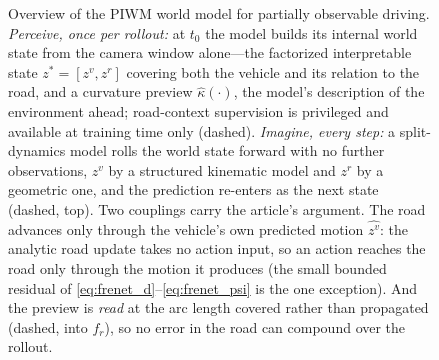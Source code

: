 \documentclass[preprint,12pt]{elsarticle}
\newcommand{\zv}{z^{v}}      %
\newcommand{\zr}{z^{r}}      %
\newcommand{\zstar}{z^{*}}   %
\begin{document}
\begin{figure}[t]
    \caption{Overview of the PIWM world model for partially observable driving.
    \emph{Perceive, once per rollout:} at $t_0$ the model builds its internal
    world state from the camera window alone---the factorized interpretable
    state $\zstar = [\zv, \zr]$ covering both the vehicle and its relation to
    the road, and a curvature preview $\hat\kappa(\cdot)$, the model's
    description of the environment ahead; road-context supervision is
    privileged and available at training time only (dashed).
    \emph{Imagine, every step:} a split-dynamics model rolls the world state
    forward with no further observations, $\zv$ by a structured kinematic
    model and $\zr$ by a geometric one, and the prediction re-enters as the
    next state (dashed, top).
    Two couplings carry the article's argument. The road advances only through
    the vehicle's own predicted motion $\hat{\zv}$: the analytic road update
    takes no action input, so an action reaches the road only through the
    motion it produces (the small bounded residual of
    \eqref{eq:frenet_d}--\eqref{eq:frenet_psi} is the one exception). And the
    preview is \emph{read} at the arc length covered rather than propagated
    (dashed, into $f_r$), so no error in the road can compound over the
    rollout.}
    \label{fig:arch}
\end{figure}
\end{document}

